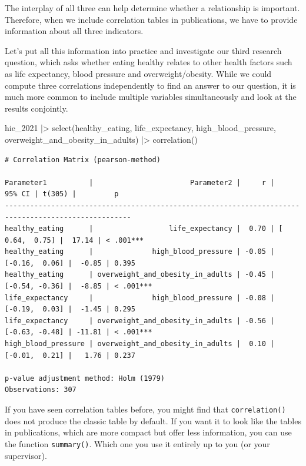 \documentclass[
  letterpaper,
]{krantz}
\makeatletter
\newenvironment{Shaded}{\begin{snugshade}}{\end{snugshade}}
\newcommand{\FunctionTok}[1]{\textcolor[rgb]{0.28,0.35,0.67}{#1}}
\newcommand{\NormalTok}[1]{\textcolor[rgb]{0.00,0.23,0.31}{#1}}
\newcommand{\SpecialCharTok}[1]{\textcolor[rgb]{0.37,0.37,0.37}{#1}}
\newenvironment{kframe}{%
\medskip{}
\setlength{\fboxsep}{.8em}
 \def\at@end@of@kframe{}%
 \ifinner\ifhmode%
  \def\at@end@of@kframe{\end{minipage}}%
  \begin{minipage}{\columnwidth}%
 \fi\fi%
 \def\FrameCommand##1{\hskip\@totalleftmargin \hskip-\fboxsep
 \colorbox{shadecolor}{##1}\hskip-\fboxsep
     \hskip-\linewidth \hskip-\@totalleftmargin \hskip\columnwidth}%
 \MakeFramed {\advance\hsize-\width
   \@totalleftmargin\z@ \linewidth\hsize
   \@setminipage}}%
 {\par\unskip\endMakeFramed%
 \at@end@of@kframe}
\renewenvironment{Shaded}{\begin{kframe}}{\end{kframe}}
\makeatother
\begin{document}
The interplay of all three can help determine whether a relationship is
important. Therefore, when we include correlation tables in
publications, we have to provide information about all three indicators.

Let's put all this information into practice and investigate our third
research question, which asks whether eating healthy relates to other
health factors such as life expectancy, blood pressure and
overweight/obesity. While we could compute three correlations
independently to find an answer to our question, it is much more common
to include multiple variables simultaneously and look at the results
conjointly.

\begin{Shaded}
\begin{Highlighting}[]
\NormalTok{hie\_2021 }\SpecialCharTok{|\textgreater{}}
  \FunctionTok{select}\NormalTok{(healthy\_eating, life\_expectancy, high\_blood\_pressure, overweight\_and\_obesity\_in\_adults) }\SpecialCharTok{|\textgreater{}}
  \FunctionTok{correlation}\NormalTok{()}
\end{Highlighting}
\end{Shaded}

\begin{verbatim}
# Correlation Matrix (pearson-method)

Parameter1          |                       Parameter2 |     r |         95% CI | t(305) |         p
----------------------------------------------------------------------------------------------------
healthy_eating      |                  life_expectancy |  0.70 | [ 0.64,  0.75] |  17.14 | < .001***
healthy_eating      |              high_blood_pressure | -0.05 | [-0.16,  0.06] |  -0.85 | 0.395    
healthy_eating      | overweight_and_obesity_in_adults | -0.45 | [-0.54, -0.36] |  -8.85 | < .001***
life_expectancy     |              high_blood_pressure | -0.08 | [-0.19,  0.03] |  -1.45 | 0.295    
life_expectancy     | overweight_and_obesity_in_adults | -0.56 | [-0.63, -0.48] | -11.81 | < .001***
high_blood_pressure | overweight_and_obesity_in_adults |  0.10 | [-0.01,  0.21] |   1.76 | 0.237    

p-value adjustment method: Holm (1979)
Observations: 307
\end{verbatim}

If you have seen correlation tables before, you might find that
\texttt{correlation()} does not produce the classic table by default. If
you want it to look like the tables in publications, which are more
compact but offer less information, you can use the function
\texttt{summary()}. Which one you use it entirely up to you (or your
supervisor).
\end{document}
